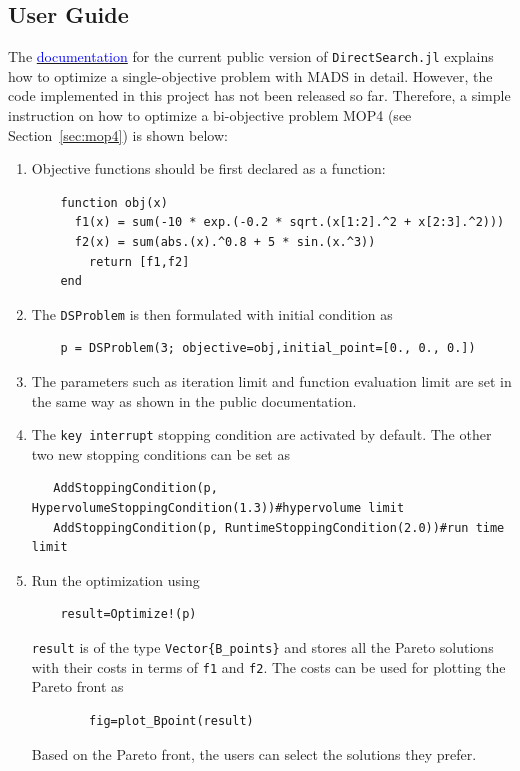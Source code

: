 \documentclass[11pt,oneside,onecolumn,openright]{article}
\begin{document}
\subsection{User Guide}
  The \href{https://imperialcollegelondon.github.io/DirectSearch.jl/dev/}{\textcolor{blue}{documentation}} for the current public version of \verb|DirectSearch.jl| explains how to optimize a single-objective problem with MADS in detail. However, the code implemented in this project has not been released so far. Therefore, a simple instruction on how to optimize a bi-objective problem MOP4 (see Section~\ref{sec:mop4}) is shown below:
  \begin{enumerate}
  \item Objective functions should be first declared as a function:
    \begin{verbatim}
    function obj(x)
      f1(x) = sum(-10 * exp.(-0.2 * sqrt.(x[1:2].^2 + x[2:3].^2)))
      f2(x) = sum(abs.(x).^0.8 + 5 * sin.(x.^3))
        return [f1,f2]
    end
    \end{verbatim}
    \item The \verb|DSProblem| is then formulated with initial condition as
      \begin{verbatim}
    p = DSProblem(3; objective=obj,initial_point=[0., 0., 0.])
    \end{verbatim}
    \item The parameters such as iteration limit and function evaluation limit are set in the same way as shown in the public documentation.
    \item The \verb|key interrupt| stopping condition are activated by default. The other two new stopping conditions can be set as
        \begin{verbatim}
   AddStoppingCondition(p, HypervolumeStoppingCondition(1.3))#hypervolume limit
   AddStoppingCondition(p, RuntimeStoppingCondition(2.0))#run time limit
    \end{verbatim}
    \item Run the optimization using
        \begin{verbatim}
    result=Optimize!(p)
    \end{verbatim}
    \verb|result| is of the type \verb|Vector{B_points}| and stores all the Pareto solutions with their costs in terms of \verb|f1| and \verb|f2|. The costs can be used for plotting the Pareto front as
        \begin{verbatim}
        fig=plot_Bpoint(result)
    \end{verbatim}
    Based on the Pareto front, the users can select the solutions they prefer.
  \end{enumerate}
\end{document}
